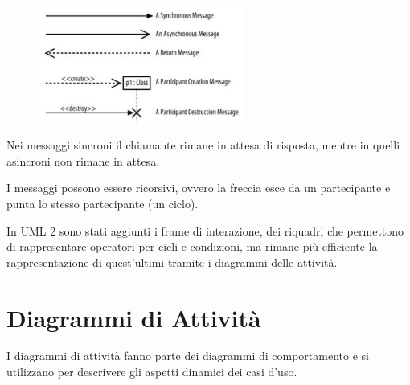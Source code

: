 \begin{figure}[H]
\centering
    \includegraphics[width=0.6\textwidth]{res/img/messaggiDiagrammiSequenza}
\end{figure}

Nei messaggi sincroni il chiamante rimane in attesa di risposta, mentre in quelli asincroni non rimane in attesa.

I messaggi possono essere ricorsivi, ovvero la freccia esce da un partecipante e punta lo stesso partecipante (un ciclo).

In UML 2 sono stati aggiunti i frame di interazione, dei riquadri che permettono di rappresentare operatori per cicli e condizioni, ma rimane più efficiente la rappresentazione di quest'ultimi tramite i diagrammi delle attività. 

\section{Diagrammi di Attività}
I diagrammi di attività fanno parte dei diagrammi di comportamento e si utilizzano per descrivere gli aspetti dinamici dei casi d'uso.


